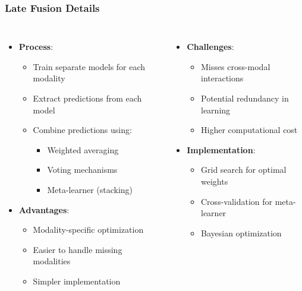 \documentclass{beamer}
\begin{document}
\begin{frame}
\frametitle{Late Fusion Details}
\begin{columns}
\begin{itemize}
    \item \textbf{Process}:
    \begin{itemize}
        \item Train separate models for each modality
        \item Extract predictions from each model
        \item Combine predictions using:
        \begin{itemize}
            \item Weighted averaging
            \item Voting mechanisms
            \item Meta-learner (stacking)
        \end{itemize}
    \end{itemize}
    \item \textbf{Advantages}:
    \begin{itemize}
        \item Modality-specific optimization
        \item Easier to handle missing modalities
        \item Simpler implementation
    \end{itemize}
\end{itemize}

\begin{itemize}
    \item \textbf{Challenges}:
    \begin{itemize}
        \item Misses cross-modal interactions
        \item Potential redundancy in learning
        \item Higher computational cost
    \end{itemize}
    \item \textbf{Implementation}:
    \begin{itemize}
        \item Grid search for optimal weights
        \item Cross-validation for meta-learner
        \item Bayesian optimization
    \end{itemize}
\end{itemize}
\end{columns}
\end{frame}
\end{document}
